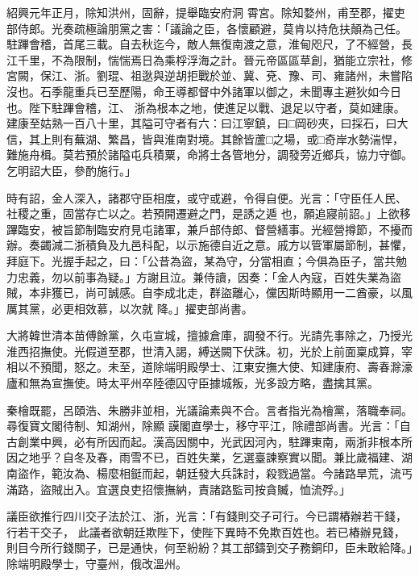 \begin{pinyinscope}
 紹興元年正月，除知洪州，固辭，提舉臨安府洞
 霄宮。除知婺州，甫至郡，擢吏部侍郎。光奏疏極論朋黨之害：「議論之臣，各懷顧避，莫肯以持危扶顛為己任。駐蹕會稽，首尾三載。自去秋迄今，敵人無復南渡之意，淮甸咫尺，了不經營，長江千里，不為限制，惴惴焉日為乘桴浮海之計。晉元帝區區草創，猶能立宗社，修宮闕，保江、浙。劉琨、祖逖與逆胡拒戰於並、冀、兗、豫、司、雍諸州，未嘗陷沒也。石季龍重兵已至歷陽，命王導都督中外諸軍以御之，未聞專主避狄如今日也。陛下駐蹕會稽，江、
 浙為根本之地，使進足以戰、退足以守者，莫如建康。建康至姑熟一百八十里，其隘可守者有六：曰江寧鎮，曰□岡砂夾，曰採石，曰大信，其上則有蕪湖、繁昌，皆與淮南對境。其餘皆蘆□之場，或□奇岸水勢湍悍，難施舟楫。莫若預於諸隘屯兵積粟，命將士各管地分，調發旁近鄉兵，協力守御。乞明詔大臣，參酌施行。」



 時有詔，金人深入，諸郡守臣相度，或守或避，令得自便。光言：「守臣任人民、社稷之重，固當存亡以之。若預開遷避之門，是誘之遁
 也，願追寢前詔。」上欲移蹕臨安，被旨節制臨安府見屯諸軍，兼戶部侍郎、督營繕事。光經營撙節，不擾而辦。奏蠲減二浙積負及九邑科配，以示施德自近之意。戚方以管軍屬節制，甚懼，拜庭下。光握手起之，曰：「公昔為盜，某為守，分當相直；今俱為臣子，當共勉力忠義，勿以前事為疑。」方謝且泣。兼侍讀，因奏：「金人內寇，百姓失業為盜賊，本非獲已，尚可誠感。自李成北走，群盜離心，儻因斯時顯用一二酋豪，以風厲其黨，必更相效慕，以次就
 降。」擢吏部尚書。



 大將韓世清本苗傅餘黨，久屯宣城，擅據倉庫，調發不行。光請先事除之，乃授光淮西招撫使。光假道至郡，世清入謁，縛送闕下伏誅。初，光於上前面稟成算，宰相以不預聞，怒之。未至，道除端明殿學士、江東安撫大使、知建康府、壽春滁濠廬和無為宣撫使。時太平州卒陸德囚守臣據城叛，光多設方略，盡擒其黨。



 秦檜既罷，呂頤浩、朱勝非並相，光議論素與不合。言者指光為檜黨，落職奉祠。尋復寶文閣待制、知湖州，除顯
 謨閣直學士，移守平江，除禮部尚書。光言：「自古創業中興，必有所因而起。漢高因關中，光武因河內，駐蹕東南，兩浙非根本所因之地乎？自冬及春，雨雪不已，百姓失業，乞選臺諫察實以聞。兼比歲福建、湖南盜作，範汝為、楊麼相鋌而起，朝廷發大兵誅討，殺戮過當。今諸路旱荒，流丐滿路，盜賊出入。宜選良吏招懷撫納，責諸路監司按貪贓，恤流殍。」



 議臣欲推行四川交子法於江、浙，光言：「有錢則交子可行。今已謂樁辦若干錢，行若干交子，
 此議者欲朝廷欺陛下，使陛下異時不免欺百姓也。若已樁辦見錢，則目今所行錢關子，已是通快，何至紛紛？其工部鑄到交子務銅印，臣未敢給降。」除端明殿學士，守臺州，俄改溫州。




\end{pinyinscope}
